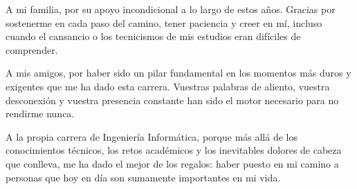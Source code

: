 A mi familia, por su apoyo incondicional a lo largo de estos años. Gracias por sostenerme en cada paso del camino, tener paciencia y creer en mí, incluso cuando el cansancio o los tecnicismos de mis estudios eran difíciles de comprender. \par \bigskip

A mis amigos, por haber sido un pilar fundamental en los momentos más duros y exigentes que me ha dado esta carrera. Vuestras palabras de aliento, vuestra desconexión y vuestra presencia constante han sido el motor necesario para no rendirme nunca. \par \bigskip

A la propia carrera de Ingeniería Informática, porque más allá de los conocimientos técnicos, los retos académicos y los inevitables dolores de cabeza que conlleva, me ha dado el mejor de los regalos: haber puesto en mi camino a personas que hoy en día son sumamente importantes en mi vida.
\tableofcontents
\listoffigures
\listoftables






